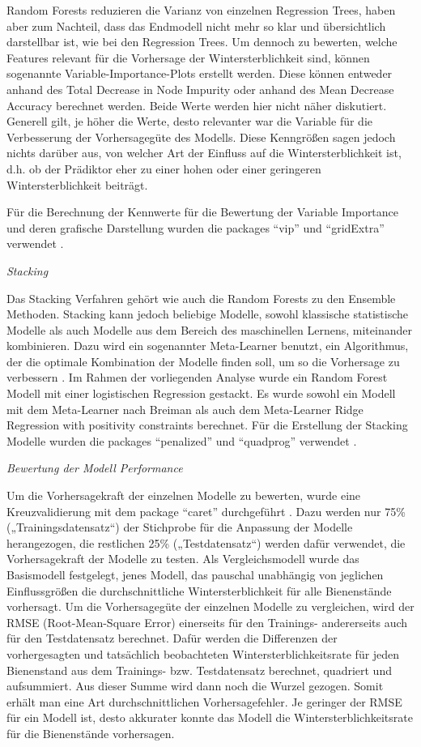 Random Forests reduzieren die Varianz von einzelnen Regression Trees, haben aber zum Nachteil, dass das Endmodell nicht mehr so klar und übersichtlich darstellbar ist, wie bei den Regression Trees. Um dennoch zu bewerten, welche Features relevant für die Vorhersage der Wintersterblichkeit sind, können sogenannte Variable-Importance-Plots erstellt werden. Diese können entweder anhand des Total Decrease in Node Impurity oder anhand des Mean Decrease Accuracy berechnet werden. Beide Werte werden hier nicht näher diskutiert. Generell gilt, je höher die Werte, desto relevanter war die Variable für die Verbesserung der Vorhersagegüte des Modells. Diese Kenngrößen sagen jedoch nichts darüber aus, von welcher Art der Einfluss auf die Wintersterblichkeit ist, d.h. ob der Prädiktor eher zu einer hohen oder einer geringeren Wintersterblichkeit beiträgt. 

Für die Berechnung der Kennwerte für die Bewertung der Variable Importance und deren grafische Darstellung wurden die packages \enquote{vip} und \enquote{gridExtra} verwendet \citep{vip, gridExtra}.


\textit{Stacking}

Das Stacking Verfahren gehört wie auch die Random Forests zu den Ensemble Methoden. Stacking kann jedoch beliebige Modelle, sowohl klassische statistische Modelle als auch Modelle aus dem Bereich des maschinellen Lernens, miteinander kombinieren. Dazu wird ein sogenannter Meta-Learner benutzt, ein Algorithmus, der die optimale Kombination der Modelle finden soll, um so die Vorhersage zu verbessern \citep{breiman1996}. Im Rahmen der vorliegenden Analyse wurde ein Random Forest Modell mit einer logistischen Regression gestackt. Es wurde sowohl ein Modell mit dem Meta-Learner nach Breiman als auch dem Meta-Learner Ridge Regression with positivity constraints berechnet. 
Für die Erstellung der Stacking Modelle wurden die packages \enquote{penalized} und \enquote{quadprog} verwendet \citep{penalized, quadprog}.


\textit{Bewertung der Modell Performance}

Um die Vorhersagekraft der einzelnen Modelle zu bewerten, wurde eine Kreuzvalidierung mit dem package \enquote{caret} durchgeführt \citep{caret}. Dazu werden nur 75\% („Trainingsdatensatz“) der Stichprobe für die Anpassung der Modelle herangezogen, die restlichen 25\% („Testdatensatz“) werden dafür verwendet, die Vorhersagekraft der Modelle zu testen. Als Vergleichsmodell wurde das Basismodell festgelegt, jenes Modell, das pauschal unabhängig von jeglichen Einflussgrößen die durchschnittliche Wintersterblichkeit für alle Bienenstände vorhersagt. Um die Vorhersagegüte der einzelnen Modelle zu vergleichen, wird der RMSE (Root-Mean-Square Error) einerseits für den Trainings- andererseits auch für den Testdatensatz berechnet. Dafür werden die Differenzen der vorhergesagten und tatsächlich beobachteten Wintersterblichkeitsrate für jeden Bienenstand aus dem Trainings- bzw. Testdatensatz berechnet, quadriert und aufsummiert. Aus dieser Summe wird dann noch die Wurzel gezogen. Somit erhält man eine Art durchschnittlichen Vorhersagefehler. Je geringer der RMSE für ein Modell ist, desto akkurater konnte das Modell die Wintersterblichkeitsrate für die Bienenstände vorhersagen.